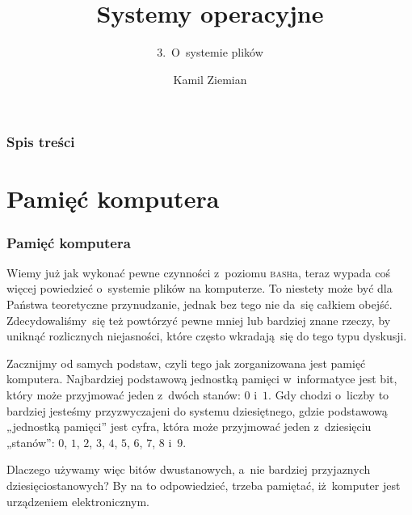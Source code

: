 \documentclass[10pt,t]{beamer}
\title{Systemy operacyjne}
\subtitle{3.~O~systemie plików}
\author{Kamil Ziemian \\
  \email}
\begin{document}





\RaggedRight





\maketitle





\begin{frame}
  \frametitle{Spis treści}


  \tableofcontents

\end{frame}










\section{Pamięć komputera}


\begin{frame}
  \frametitle{Pamięć komputera}


  Wiemy już jak wykonać pewne czynności z~poziomu \textsc{bash}a, teraz
  wypada coś więcej powiedzieć o~systemie plików na komputerze. To niestety
  może być dla Państwa teoretyczne przynudzanie, jednak bez tego nie da~się
  całkiem obejść. Zdecydowaliśmy~się też powtórzyć pewne mniej lub bardziej
  znane rzeczy, by uniknąć rozlicznych niejasności, które często
  wkradają~się do tego typu dyskusji.

  Zacznijmy od samych podstaw, czyli tego jak zorganizowana jest pamięć
  komputera. Najbardziej podstawową jednostką pamięci w~informatyce jest
  bit, który może przyjmować jeden z~dwóch stanów: $0$ i~$1$. Gdy chodzi
  o~liczby to bardziej jesteśmy przyzwyczajeni do systemu dziesiętnego,
  gdzie podstawową „jednostką pamięci” jest cyfra, która może przyjmować
  jeden z~dziesięciu „stanów”: $0$, $1$, $2$, $3$, $4$, $5$, $6$, $7$,
  $8$ i~$9$.

  Dlaczego używamy więc bitów dwustanowych, a~nie bardziej przyjaznych
  dziesięciostanowych? By na to odpowiedzieć, trzeba pamiętać, iż~komputer
  jest urządzeniem elektronicznym.

\end{frame}
\end{document}
